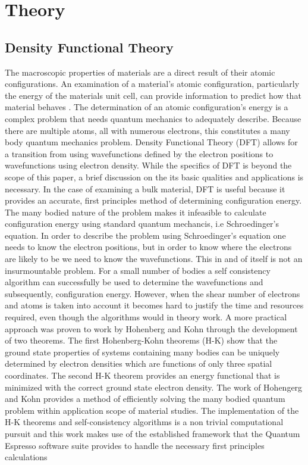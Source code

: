 \documentclass{article}
\begin{document}
\section{Theory}
\subsection{Density Functional Theory}
The macroscopic properties of materials are a direct result of their atomic configurations. An examination of a material's atomic configuration, particularly the energy of the materials unit cell, can provide information to predict how that material behaves \cite{stokes2000solid}. The determination of an atomic configuration's energy is a complex problem that needs quantum mechanics to adequately describe. Because there are multiple atoms, all with numerous electrons, this constitutes a many body quantum mechanics problem. Density Functional Theory (DFT) allows for a transition from using wavefunctions defined by the electron positions to wavefunctions using electron density\cite{sholl2011density}.
While the specifics of DFT is beyond the scope of this paper, a brief discussion on the its basic qualities and applications is necessary. In the case of examining a bulk material, DFT is useful because it provides an accurate, first principles method of determining configuration energy. The many bodied nature of the problem makes it infeasible to calculate configuration energy using standard quantum mechancis, i.e Schroedinger's equation. In order to describe the problem using Schroedinger's equation one needs to know the electron positions, but in order to know where the electrons are likely to be we need to know the wavefunctions. This in and of itself is not an insurmountable problem. For a small number of bodies a self consistency algorithm can successfully be used to determine the wavefunctions and subsequently, configuration energy\cite{ram2004schrodinger}. However, when the shear number of electrons and atoms is taken into account it becomes hard to justify the time and resources required, even though the algorithms would in theory work. A more practical approach was proven to work by Hohenberg and Kohn through the development of two theorems\cite{PhysRev.136.B864}. The first Hohenberg-Kohn theorems (H-K) show that the ground state properties of systems containing many bodies can be uniquely determined by electron densities which are functions of only three spatial coordinates. The second H-K theorem provides an energy functional that is minimized with the correct ground state electron density.
The work of Hohengerg and Kohn provides a method of efficiently solving the many bodied quantum problem within application scope of material studies. The implementation of the H-K theorems and self-consistency algorithms is a non trivial computational pursuit and this work makes use of the established framework that the Quantum Espresso software suite provides to handle the necessary first principles calculations\cite{giannozzi2009quantum}
\end{document}
